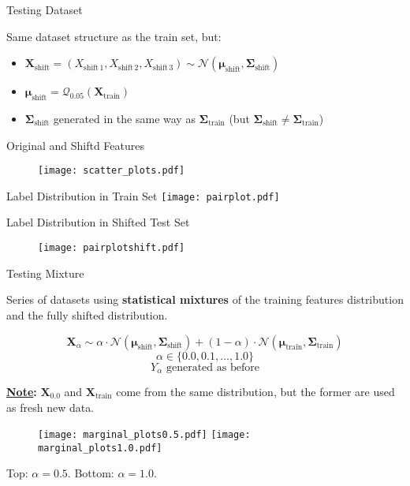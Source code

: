\begin{frame}{Testing Dataset}

    Same dataset structure as the train set, but:
    \begin{itemize}
        \item $ \boldsymbol{X}_{\text{shift}} = (X_{\text{shift}\,1}, X_{\text{shift}\,2}, X_{\text{shift}\,3}) \sim \mathcal{N}(\boldsymbol{\mu}_{\text{shift}}, \boldsymbol{\Sigma}_{\text{shift}}) $
        \item $ \boldsymbol{\mu}_{\text{shift}} = \mathcal{Q}_{0.05}(\boldsymbol{X}_{\text{train}})$
        \item $\boldsymbol{\Sigma}_{\text{shift}}$ generated in the same way as $\boldsymbol{\Sigma}_{\text{train}}$ (but $\boldsymbol{\Sigma}_{\text{shift}}\neq\boldsymbol{\Sigma}_{\text{train}}$)
    \end{itemize}
    
\end{frame}

\begin{frame}{Original and Shiftd Features}
    \begin{figure}
        \centering
        \texttt{[image: scatter\_plots.pdf]}
    \end{figure}
\end{frame}

\begin{frame}{Label Distribution in Train Set} 
    \vfill
    \centering
    \texttt{[image: pairplot.pdf]}
    \vfill

\end{frame}

\begin{frame}{Label Distribution in Shifted Test Set}
    \begin{figure}
        \centering
        \vfill
        \texttt{[image: pairplotshift.pdf]}
    \end{figure}
\end{frame}

\begin{frame}{Testing Mixture}
    
    Series of datasets using \textbf{statistical mixtures} of the training features distribution and the fully shifted distribution.

    $$
    \boldsymbol{X}_\alpha \sim \alpha\cdot\mathcal{N}(\boldsymbol{\mu}_{\text{shift}}, \boldsymbol{\Sigma}_{\text{shift}}) + (1-\alpha)\cdot\mathcal{N}(\boldsymbol{\mu}_{\text{train}}, \boldsymbol{\Sigma}_{\text{train}})
    $$
    $$
    \alpha \in \{0.0, 0.1, \dots, 1.0\}
    $$
    $$
    Y_\alpha \text{ generated as before}
    $$

    \textbf{\underline{Note}:} $\boldsymbol{X}_{0.0}$ and $\boldsymbol{X}_{\text{train}}$ come from the same distribution, but the former are used as fresh new data.

\end{frame}

\begin{frame}
    \vfill
    \begin{figure}
        \centering
        \texttt{[image: marginal\_plots0.5.pdf]}
        \texttt{[image: marginal\_plots1.0.pdf]}
    \end{figure}
    Top: $\alpha=0.5$. Bottom: $\alpha=1.0$.
\end{frame}

